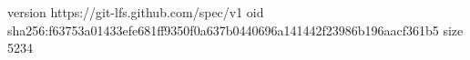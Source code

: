 version https://git-lfs.github.com/spec/v1
oid sha256:f63753a01433efe681ff9350f0a637b0440696a141442f23986b196aacf361b5
size 5234
